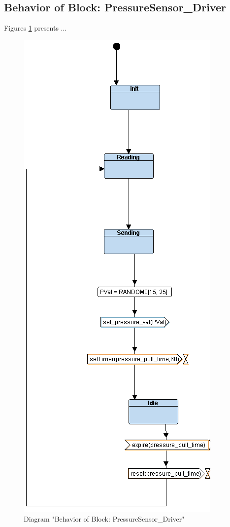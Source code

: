 \subsection{Behavior of Block: PressureSensor\_Driver}
Figures \ref{fig:PressureSensorDriverPressureSensorDriver24} presents ...
\begin{figure}[htb]
\centering
\includegraphics[width=\textwidth]{img_2_4.png}
\caption{Diagram "Behavior of Block: PressureSensor\_Driver"}
\label{fig:PressureSensorDriverPressureSensorDriver24}
\end{figure}

